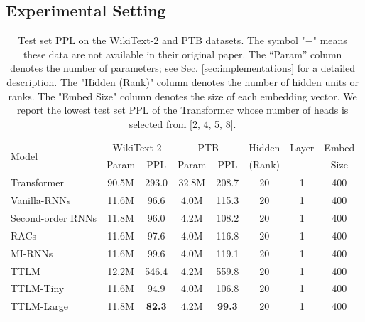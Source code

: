 \documentclass{article}
\theoremstyle{plain}
\theoremstyle{definition}
\theoremstyle{remark}
\begin{document}
\subsection{Experimental Setting}
\label{sec:setting}
\begin{table}[t]
\small
\centering
  \begin{tabular}{l|cc|cc|ccc}
    \toprule
      \multirow{2}{*}{Model} & \multicolumn{2}{c|}{
      WikiText-2} &
    \multicolumn{2}{c|}{PTB} & Hidden & Layer & Embed  \\
    
    &Param & PPL  & Param  & PPL & (Rank) & & Size\\
    
    \midrule
    Transformer \citep{vaswani2017attention} & 90.5M & 293.0 & 32.8M & 208.7 &20 & 1 & 400 \\
    Vanilla-RNNs \citep{mikolov2012context} & 11.6M & 96.6 & 4.0M & 115.3 & 20 & 1 & 400\\
    Second-order RNNs \citep{hochreiter1997long} & 11.8M & 96.0 & 4.2M& 108.2 & 20 & 1 & 400\\
    RACs  \citep{levine2018benefits} &11.6M& 97.6 & 4.0M  & 116.8 &20 & 1 & 400 \\
    MI-RNNs \citep{wu_multiplicative_2016} &  11.6M & 99.6 &4.0M & 119.1 & 20 & 1 & 400 \\
    \hline
    TTLM & 12.2M & 546.4 & 4.2M & 559.8 & 20& 1 & 400\\
    TTLM-Tiny & 11.6M &94.9 & 4.0M &106.8 & 20 & 1 & 400\\
    TTLM-Large &11.8M &\textbf{82.3} & 4.2M & \textbf{99.3} & 20 & 1 & 400 \\
  \bottomrule
\end{tabular}
\caption{Test set PPL on the WikiText-2 and PTB datasets. The symbol "$-$" means these data are not available in their original paper. The “Param” column denotes the number of parameters; see Sec. \ref{sec:implementations} for a detailed description.  The "Hidden (Rank)" column  denotes the number of hidden units or ranks. The "Embed Size" column denotes the size of each embedding vector.  We report the lowest test set PPL of the Transformer whose number of heads is  selected from [2, 4, 5, 8]. \label{tab:evaluation}}
\end{table}
%
\end{document}

